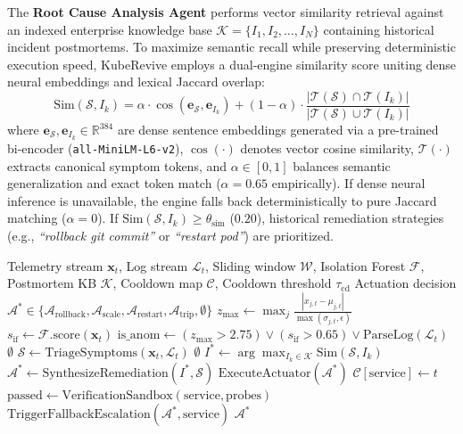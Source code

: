 \documentclass[conference]{IEEEtran}
\begin{document}
The \textbf{Root Cause Analysis Agent} performs vector similarity retrieval against an indexed enterprise knowledge base $\mathcal{K} = \{I_1, I_2, \dots, I_N\}$ containing historical incident postmortems. To maximize semantic recall while preserving deterministic execution speed, KubeRevive employs a dual-engine similarity score uniting dense neural embeddings and lexical Jaccard overlap:
\begin{equation}
\text{Sim}(\mathcal{S}, I_k) = \alpha \cdot \cos\left(\mathbf{e}_{\mathcal{S}}, \mathbf{e}_{I_k}\right) + (1 - \alpha) \cdot \frac{|\mathcal{T}(\mathcal{S}) \cap \mathcal{T}(I_k)|}{|\mathcal{T}(\mathcal{S}) \cup \mathcal{T}(I_k)|}
\end{equation}
where $\mathbf{e}_{\mathcal{S}}, \mathbf{e}_{I_k} \in \mathbb{R}^{384}$ are dense sentence embeddings generated via a pre-trained bi-encoder (\texttt{all-MiniLM-L6-v2}), $\cos(\cdot)$ denotes vector cosine similarity, $\mathcal{T}(\cdot)$ extracts canonical symptom tokens, and $\alpha \in [0, 1]$ balances semantic generalization and exact token match ($\alpha = 0.65$ empirically). If dense neural inference is unavailable, the engine falls back deterministically to pure Jaccard matching ($\alpha = 0$). If $\text{Sim}(\mathcal{S}, I_k) \ge \theta_{\text{sim}}$ ($0.20$), historical remediation strategies (e.g., \textit{``rollback git commit''} or \textit{``restart pod''}) are prioritized.

\begin{algorithm}[t]
\caption{KubeRevive Closed-Loop Autonomous Healing}
\label{alg:healing}
\begin{algorithmic}[1]
\REQUIRE Telemetry stream $\mathbf{x}_t$, Log stream $\mathcal{L}_t$, Sliding window $\mathcal{W}$, Isolation Forest $\mathcal{F}$, Postmortem KB $\mathcal{K}$, Cooldown map $\mathcal{C}$, Cooldown threshold $\tau_{\text{cd}}$
\ENSURE Actuation decision $\mathcal{A}^* \in \{\mathcal{A}_{\text{rollback}}, \mathcal{A}_{\text{scale}}, \mathcal{A}_{\text{restart}}, \mathcal{A}_{\text{trip}}, \emptyset\}$
\STATE $z_{\text{max}} \leftarrow \max_j \frac{|x_{j,t} - \mu_{j,t}|}{\max(\sigma_{j,t}, \epsilon)}$
\STATE $s_{\text{if}} \leftarrow \mathcal{F}.\text{score}(\mathbf{x}_t)$
\STATE $\text{is\_anom} \leftarrow (z_{\text{max}} > 2.75) \lor (s_{\text{if}} > 0.65) \lor \text{ParseLog}(\mathcal{L}_t)$
    \RETURN $\emptyset$
\ENDIF
\STATE $\mathcal{S} \leftarrow \text{TriageSymptoms}(\mathbf{x}_t, \mathcal{L}_t)$
    \RETURN $\emptyset$ 
\ENDIF
\STATE $I^* \leftarrow \arg\max_{I_k \in \mathcal{K}} \text{Sim}(\mathcal{S}, I_k)$
\STATE $\mathcal{A}^* \leftarrow \text{SynthesizeRemediation}(I^*, \mathcal{S})$
\STATE $\text{ExecuteActuator}(\mathcal{A}^*)$
\STATE $\mathcal{C}[\text{service}] \leftarrow t$
\STATE $\text{passed} \leftarrow \text{VerificationSandbox}(\text{service}, \text{probes})$
    \STATE $\text{TriggerFallbackEscalation}(\mathcal{A}^*, \text{service})$
\ENDIF
\RETURN $\mathcal{A}^*$
\end{algorithmic}
\end{algorithm}
\end{document}
